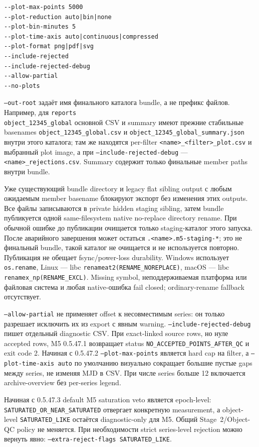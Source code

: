 \begin{lstlisting}
--plot-max-points 5000
--plot-reduction auto|bin|none
--plot-bin-minutes 5
--plot-time-axis auto|continuous|compressed
--plot-format png|pdf|svg
--include-rejected
--include-rejected-debug
--allow-partial
--no-plots
\end{lstlisting}

\texttt{--out-root} задаёт имя финального каталога bundle, а не префикс файлов. Например,
для \texttt{reports\\object\_12345\_global} основной CSV и summary имеют прежние стабильные
basenames \texttt{object\_12345\_global.csv} и
\texttt{object\_12345\_global\_summary.json} внутри этого каталога; там же находятся
per-filter \texttt{<name>\_<filter>\_plot.csv} и выбранный plot image, а при
\texttt{--include-rejected-debug} --- \texttt{<name>\_rejections.csv}. Summary содержит
только финальные member paths внутри bundle.

Уже существующий bundle directory и legacy flat sibling output с любым ожидаемым member
basename блокируют экспорт без изменения этих outputs. Все файлы записываются в private
hidden staging sibling, затем bundle публикуется одной same-filesystem native no-replace
directory rename. При обычной ошибке до публикации очищается только staging-каталог этого
запуска. После аварийного завершения может остаться
\texttt{.<name>.m5-staging-*}; это не финальный bundle, такой каталог не очищается и не
используется повторно. Публикация не обещает fsync/power-loss durability. Windows использует
\texttt{os.rename}, Linux --- libc \texttt{renameat2(RENAME\_NOREPLACE)}, macOS --- libc
\texttt{renamex\_np(RENAME\_EXCL)}. Missing symbol, неподдерживаемая платформа или
файловая система и любая native-ошибка fail closed; ordinary-rename fallback отсутствует.

\texttt{--allow-partial} не применяет offset к несовместимым series: он только разрешает исключить их из export с явным warning. \texttt{--include-rejected-debug} пишет отдельный diagnostic CSV. При exact-linked source rows, но нуле accepted rows, M5 0.5.47.1 возвращает status \texttt{NO\_ACCEPTED\_POINTS\_AFTER\_QC} и exit code 2. Начиная с 0.5.47.2 \texttt{--plot-max-points} является hard cap на filter, а \texttt{--plot-time-axis auto} по умолчанию визуально сокращает большие пустые gaps между series, не изменяя MJD в CSV. При числе series больше 12 включается archive-overview без per-series legend.

Начиная с 0.5.47.3 default M5 saturation veto является epoch-level: \texttt{SATURATED\_OR\_NEAR\_SATURATED} отвергает конкретную measurement, а object-level \texttt{SATURATED\_LIKE} остаётся diagnostic-only для M5. Общий Stage~2/Object-QC policy не меняется. При необходимости strict series-level rejection можно вернуть явно: \texttt{--extra-reject-flags SATURATED\_LIKE}.


